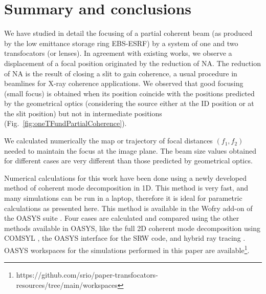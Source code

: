 \documentclass{iucr}              %
\newcommand{\todo}[1]{{\color{red}[TODO: "#1'']}}
\begin{document}



\section{Summary and conclusions}
\label{sec:summary}

We have studied in detail the focusing of a partial coherent beam (as produced by the low emittance storage ring EBS-ESRF) by a system of one and two transfocators (or lenses). In agreement with existing works, we observe a displacement of a focal position originated by the reduction of NA. The reduction of NA is the result of closing a slit to gain coherence, a usual procedure in beamlines for X-ray coherence applications. We observed that good focusing (small focus) is obtained when its position coincide with the positions predicted by the geometrical optics (considering the source either at the ID position or at the slit position) but not in intermediate positions (Fig.~\ref{fig:oneTFundPartialCoherence}).

We calculated numerically the map or trajectory of focal distances $(f_1,f_2)$ needed to maintain the focus at the image plane. The beam size values obtained for different cases are very different than those predicted by geometrical optics.  

Numerical calculations for this work have been done using a newly developed method of coherent mode decomposition in 1D. This method is very fast, and many simulations can be run in a laptop, therefore it is ideal for parametric calculations as presented here. This method is available in the Wofry add-on of the OASYS suite \cite{codeOASYS}. Four cases are calculated and compared using the other methods available in OASYS, like the full 2D coherent mode decomposition using COMSYL \cite{codeCOMSYL}, the OASYS interface for the SRW \cite{codeSRW} code, and hybrid ray tracing \cite{codeHYBRID}. OASYS workspaces for the simulations performed in this paper are available\footnote{{ https://github.com/srio/paper-transfocators-resources/tree/main/workspaces}}.
\end{document}
